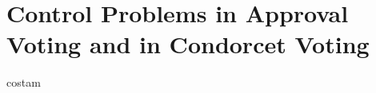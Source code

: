 \chapter{Control Problems in Approval Voting and in Condorcet Voting} \label{ch:approval_condorcet}

costam